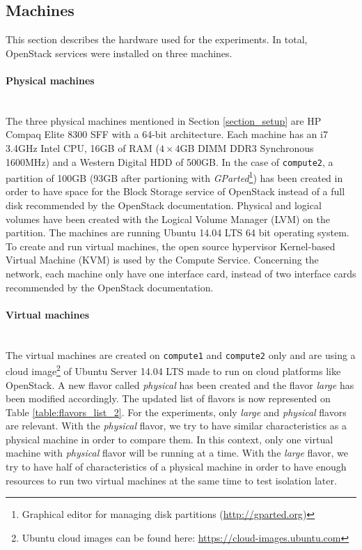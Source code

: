 \subsection{Machines}
This section describes the hardware used for the experiments.
In total, OpenStack services were installed on three machines.


\paragraph{Physical machines}\mbox{}\\
The three physical machines mentioned in Section \ref{section_setup} are HP Compaq Elite 8300 SFF with a 64-bit architecture. 
Each machine has an i7 3.4GHz Intel CPU, 16GB of RAM ($4\times4$GB DIMM DDR3 Synchronous 1600MHz) and a Western Digital HDD of 500GB. 
In the case of \texttt{compute2}, a partition of 100GB (93GB after partioning with \textit{GParted}\footnote{Graphical editor for managing disk partitions (\url{http://gparted.org})}) has been created in order to have space for the Block Storage service of OpenStack instead of a full disk recommended by the OpenStack documentation. 
Physical and logical volumes have been created with the Logical Volume Manager (LVM) on the partition.
The machines are running Ubuntu 14.04 LTS 64 bit operating system. 
To create and run virtual machines, the open source hypervisor Kernel-based Virtual Machine (KVM) is used by the Compute Service. Concerning the network, each machine only have one interface card, instead of two interface cards recommended by the OpenStack documentation.



\paragraph{Virtual machines}\mbox{}\\
The virtual machines are created on \texttt{compute1} and \texttt{compute2} only and are using a cloud image\footnote{Ubuntu cloud images can be found here: \url{https://cloud-images.ubuntu.com}} of Ubuntu Server 14.04 LTS made to run on cloud platforms like OpenStack. 
A new flavor called \textit{physical} has been created and the flavor \textit{large} has been modified accordingly. 
The updated list of flavors is now represented on Table \ref{table:flavors_list_2}. 
For the experiments, only \textit{large} and \textit{physical} flavors are relevant. 
With the \textit{physical} flavor, we try to have similar characteristics as a physical machine in order to compare them. 
In this context, only one virtual machine with \textit{physical} flavor will be running at a time. 
With the \textit{large} flavor, we try to have half of characteristics of a physical machine in order to have enough resources to run two virtual machines at the same time to test isolation later.

